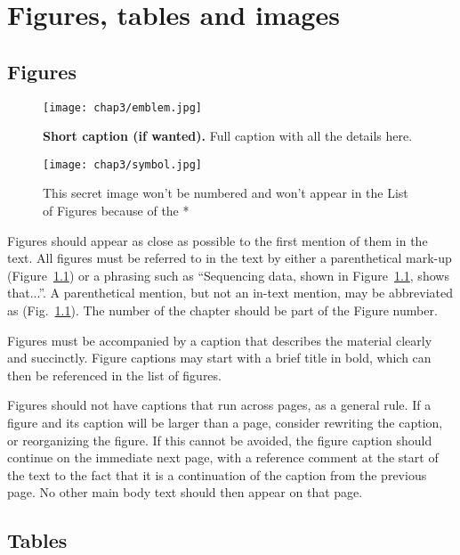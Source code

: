 

\chapter{Figures, tables and images} \label{chap-3}

\section{Figures}

\begin{figure}
\center
\texttt{[image: chap3/emblem.jpg]} 
\caption[Short caption for List of Figures]{{\bfseries Short caption (if wanted).} Full caption with all the details here.}
\label{fig-example}
\end{figure}

\begin{figure}
\center
\texttt{[image: chap3/symbol.jpg]} 
\caption*{This secret image won't be numbered and won't appear in the List of Figures because of the *}
\end{figure}

Figures should appear as close as possible to the first mention of them in the text. All figures must be referred to in the text by either a parenthetical mark-up (Figure~\ref{fig-example}) or a phrasing such as ``Sequencing data, shown in Figure~\ref{fig-example}, shows that...''.  A parenthetical mention, but not an in-text mention, may be abbreviated as (Fig.~\ref{fig-example}).  The number of the chapter should be part of the Figure number.

Figures must be accompanied by a caption that describes the material clearly and succinctly. Figure captions may start with a brief title in bold, which can then be referenced in the list of figures. 

Figures should not have captions that run across pages, as a general rule. If a figure and its caption will be larger than a page, consider rewriting the caption, or reorganizing the figure.  If this cannot be avoided, the figure caption should continue on the immediate next page, with a reference comment at the start of the text to the fact that it is a continuation of the caption from the previous page.  No other main body text should then appear on that page.

\section{Tables}

